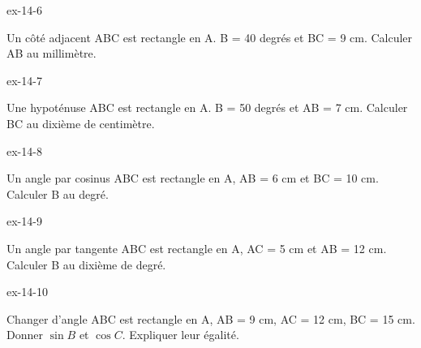 \clearpage{}
\begin{blocLivre}{ex-14-6}\begin{exercice}[2]{Un côté adjacent}
ABC est rectangle en A. B = 40 degrés et BC = 9 cm. Calculer AB au millimètre.
\label{fig-ex-14-6}
\end{exercice}\end{blocLivre}
\begin{blocLivre}{ex-14-7}\begin{exercice}[2]{Une hypoténuse}
ABC est rectangle en A. B = 50 degrés et AB = 7 cm. Calculer BC au dixième de centimètre.
\label{fig-ex-14-7}
\end{exercice}\end{blocLivre}
\begin{blocLivre}{ex-14-8}\begin{exercice}[2]{Un angle par cosinus}
ABC est rectangle en A, AB = 6 cm et BC = 10 cm. Calculer B au degré.
\label{fig-ex-14-8}
\end{exercice}\end{blocLivre}
\begin{blocLivre}{ex-14-9}\begin{exercice}[2]{Un angle par tangente}
ABC est rectangle en A, AC = 5 cm et AB = 12 cm. Calculer B au dixième de degré.
\label{fig-ex-14-9}
\end{exercice}\end{blocLivre}
\begin{blocLivre}{ex-14-10}\begin{exercice}[2]{Changer d’angle}
ABC est rectangle en A, AB = 9 cm, AC = 12 cm, BC = 15 cm. Donner $\sin B$ et $\cos C$. Expliquer leur égalité.
\label{fig-ex-14-10}
\end{exercice}\end{blocLivre}

